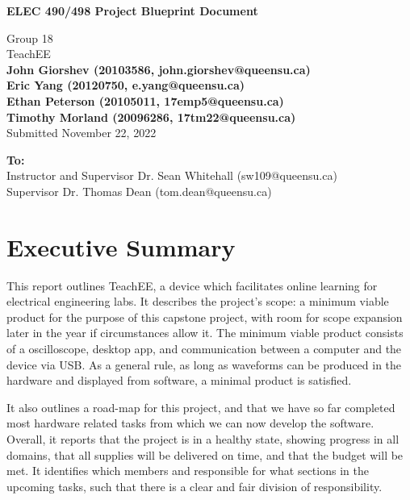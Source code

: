 \documentclass[letterpaper,12pt]{article}
\begin{document}
\begin{titlepage}
    \begin{center}
        \vspace*{1cm}

        \Large
        \textbf{ELEC 490/498 Project Blueprint Document}

        \vspace{0.5cm}
        Group 18\\
        TeachEE\\
        \vspace{0.5cm}
        \normalsize
        \textbf{John Giorshev (20103586, john.giorshev@queensu.ca) \\ Eric Yang (20120750, e.yang@queensu.ca) \\ Ethan Peterson (20105011, 17emp5@queensu.ca) \\ Timothy Morland (20096286, 17tm22@queensu.ca)}\\
        \vspace{0.5cm}
        Submitted November 22, 2022\\

        \vfill
            
        \textbf{To:}\\
        Instructor and Supervisor Dr. Sean Whitehall (sw109@queensu.ca) \\
        Supervisor Dr. Thomas Dean (tom.dean@queensu.ca) \\
            
        \vspace{1.8cm}

    \end{center}
\end{titlepage}
\section{Executive Summary}

This report outlines TeachEE, a device which facilitates online learning for
electrical engineering labs. It describes the project's scope: a minimum viable
product for the purpose of this capstone project, with room for scope expansion
later in the year if circumstances allow it. The minimum viable product consists
of a oscilloscope, desktop app, and communication between a computer and the
device via USB. As a general rule, as long as waveforms can be produced in the
hardware and displayed from software, a minimal product is satisfied.

It also outlines a road-map for this project, and that we have so far completed
most hardware related tasks from which we can now develop the software. Overall,
it reports that the project is in a healthy state, showing progress in all
domains, that all supplies will be delivered on time, and that the budget will
be met. It identifies which members and responsible for what sections in the
upcoming tasks, such that there is a clear and fair division of responsibility.
\end{document}
